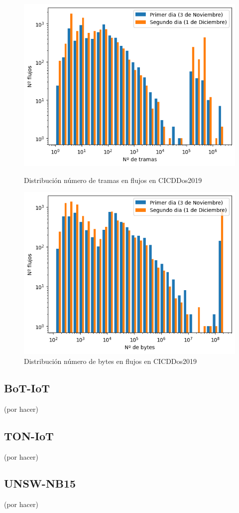 \begin{figure}[H]
      \includegraphics[width=\linewidth]{media/cicddos_2019_pcap_frames_distribution.png}
      \captionsetup{justification=centering}
      \caption{Distribución número de tramas en flujos en CICDDos2019}\label{fig:cicddos_2019_pcap_frames_distribution}
    \endminipage\hfill
      \includegraphics[width=\linewidth]{media/cicddos_2019_pcap_bytes_distribution.png}
      \captionsetup{justification=centering}
      \caption{Distribución número de bytes en flujos en CICDDos2019}\label{fig:cicddos_2019_pcap_bytes_distribution}
    \endminipage\hfill
\end{figure}



\subsection{BoT-IoT}

(por hacer)

\subsection{TON-IoT}

(por hacer)

\subsection{UNSW-NB15}

(por hacer)
